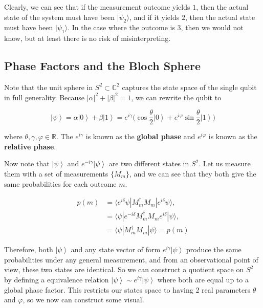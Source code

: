 \documentclass{article}
\newcommand{\ket}[1]{\ensuremath{\left|#1\right\rangle}}
\begin{document}
      Clearly, we can see that if the measurement outcome yields $1$, then the actual state of the system must have been $|\psi_2\rangle$, and if it yields $2$, then the actual state must have been $|\psi_1 \rangle$. In the case where the outcome is $3$, then we would not know, but at least there is no risk of misinterpreting.  

  \subsection{Phase Factors and the Bloch Sphere}

    \begin{definition}
      Note that the unit sphere in $S^2 \subset \mathbb{C}^2$ captures the state space of the single qubit in full generality. Because $|\alpha|^2 + |\beta|^2 = 1$, we can rewrite the qubit to 

      \begin{equation}
        \ket{\psi} = \alpha \ket{0} + \beta \ket{1} = e^{i \gamma} \bigg( \cos{\frac{\theta}{2}} \ket{0} + e^{i \varphi} \sin{\frac{\theta}{2}} \ket{1} \bigg) 
        \label{eq:global_phase}
      \end{equation}

      where $\theta, \gamma, \varphi \in \mathbb{R}$. The $e^{i \gamma}$ is known as the \textbf{global phase} and $e^{i \varphi}$ is known as the \textbf{relative phase}. 
    \end{definition}

    Now note that $\ket{\psi}$ and $e^{- i \gamma} \ket{\psi}$ are two different states in $S^2$. Let us measure them with a set of measurements $\{M_m\}$, and we can see that they both give the same probabilities for each outcome $m$. 
    
    \begin{align*}
      p(m) & = \langle e^{i \delta} \psi | M_m^\dagger M_m | e^{i \delta} \psi \rangle, \\
      & = \langle \psi | e^{-i \delta} M_m^\dagger M_m e^{i \delta} | \psi \rangle, \\
      & = \langle \psi | M_m^\dagger M_m | \psi \rangle = p(m)
    \end{align*}

    Therefore, both $\ket{\psi}$ and any state vector of form $e^{i \gamma} \ket{\psi}$ produce the same probabilities under any general measurement, and from an observational point of view, these two states are identical. So we can construct a quotient space on $S^2$ by defining a equivalence relation $\ket{\psi} \sim e^{i\gamma} \ket{\psi}$ where both are equal up to a global phase factor. This restricts our states space to having 2 real parameters $\theta$ and $\varphi$, so we now can construct some visual. 
\end{document}
